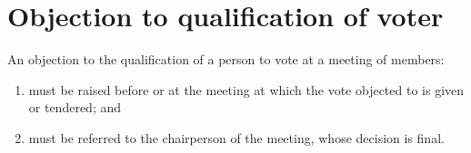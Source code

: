 \section{Objection to qualification of voter}

An objection to the qualification of a person to vote at a meeting of members:

\begin{enumerate}[label=(\alph*)]
    \item must be raised before or at the meeting at which the vote objected to is given or tendered; and
    
    \item must be referred to the chairperson of the meeting, whose decision is final.
\end{enumerate} 